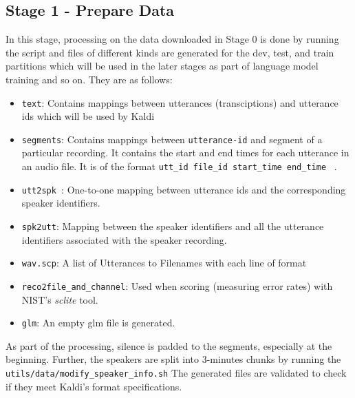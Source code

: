 \subsection{Stage 1 - Prepare Data}

In this stage, processing on the data downloaded in Stage 0 is done by running the script  and files of different kinds are generated for the dev, test, and train partitions which will be used in the later stages as part of language model training and so on.
They are as follows:
\begin{itemize}
    \item \texttt{text}: Contains mappings between utterances (transciptions) and utterance ids which will be used by Kaldi
    \item \texttt{segments}: Contains mappings between \texttt{utterance-id} and segment of a particular recording. It contains the start and end times for each utterance in an audio file. It is of the format 
    \texttt{utt\_id file\_id start\_time end\_time} ~\cite{kalditut}.

    \item \texttt{utt2spk }: One-to-one mapping between utterance ids and the corresponding speaker identifiers. 
    \item \texttt{spk2utt}: Mapping between the speaker identifiers and all the utterance identifiers associated with the speaker recording. 
    \item \texttt{wav.scp}: A list of Utterances to Filenames with each line of format 
    \item \texttt{reco2file\_and\_channel}: Used when scoring (measuring error rates) with NIST's \emph{sclite} tool.
    \item \texttt{glm}: An empty glm file is generated.
\end{itemize}

As part of the processing, silence is padded to the segments, especially at the beginning.
Further, the speakers are split into 3-minutes chunks by running the \texttt{utils/data/modify\_speaker\_info.sh}
The generated files are validated to check if they meet Kaldi's format specifications.



